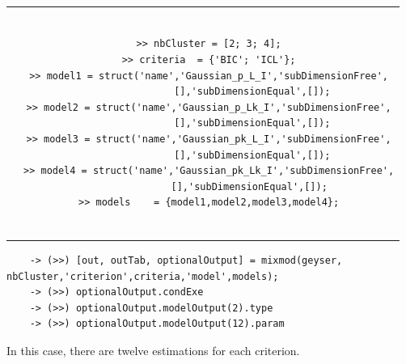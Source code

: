 \begin{itemize}
\begin{tabular}{c|c}
\begin{minipage}[c]{0.48\columnwidth}
{\begin{verbatim}
\end{verbatim}}
\end{minipage}%
&
\begin{minipage}[c]{0.5\columnwidth}%
{\scriptsize
\begin{verbatim}

>> nbCluster = [2; 3; 4];
>> criteria  = {'BIC'; 'ICL'};
>> model1 = struct('name','Gaussian_p_L_I','subDimensionFree',
               [],'subDimensionEqual',[]);
>> model2 = struct('name','Gaussian_p_Lk_I','subDimensionFree',
               [],'subDimensionEqual',[]);
>> model3 = struct('name','Gaussian_pk_L_I','subDimensionFree',
               [],'subDimensionEqual',[]);
>> model4 = struct('name','Gaussian_pk_Lk_I','subDimensionFree',
              [],'subDimensionEqual',[]);
>> models    = {model1,model2,model3,model4};


\end{verbatim}}
\end{minipage}%
\end{tabular}
{\scriptsize
\begin{verbatim}
    -> (>>) [out, outTab, optionalOutput] = mixmod(geyser, nbCluster,'criterion',criteria,'model',models);
    -> (>>) optionalOutput.condExe
    -> (>>) optionalOutput.modelOutput(2).type
    -> (>>) optionalOutput.modelOutput(12).param
\end{verbatim}}

In this case, there are twelve estimations for each criterion.
\end{itemize}


